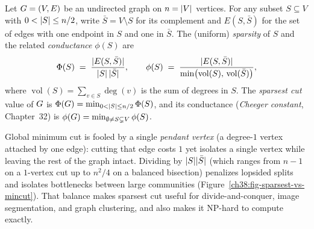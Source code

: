 \begin{definition}\label{ch38:def-sparsest}
Let $G=(V,E)$ be an undirected graph on $n=\lvert V\rvert$ vertices. For any subset $S\subseteq V$ with
$0<\lvert S\rvert\le n/2$, write $\bar S = V\setminus S$ for its complement and $E(S,\bar S)$ for the set of
edges with one endpoint in $S$ and one in $\bar S$. The (uniform) \emph{sparsity} of $S$ and the
related \emph{conductance} $\phi(S)$ are
\[
  \Phi(S) \;=\; \frac{\lvert E(S,\bar S)\rvert}{\lvert S\rvert\,\lvert\bar S\rvert},
  \qquad
  \phi(S) \;=\; \frac{\lvert E(S,\bar S)\rvert}{\min\bigl(\operatorname{vol}(S),\,\operatorname{vol}(\bar S)\bigr)},
\]
where $\operatorname{vol}(S)=\sum_{v\in S}\deg(v)$ is the sum of degrees in $S$. The \emph{sparsest cut}
value of $G$ is $\Phi(G) = \min_{0<\lvert S\rvert\le n/2}\Phi(S)$, and its conductance (\emph{Cheeger constant},
Chapter~32) is $\phi(G) = \min_{\emptyset\neq S\subsetneq V} \phi(S)$.
\end{definition}

\begin{intuitionbox}
Global minimum cut is fooled by a single \emph{pendant vertex} (a degree-$1$ vertex attached by one edge):
cutting that edge costs $1$ yet isolates a single vertex while leaving the rest of the graph intact.
Dividing by $\lvert S\rvert\lvert\bar S\rvert$ (which ranges from $n-1$ on a $1$-vertex cut up to $n^2/4$ on a balanced
bisection) penalizes lopsided splits and isolates bottlenecks between large communities
(Figure~\ref{ch38:fig-sparsest-vs-mincut}). That balance makes sparsest cut useful for divide-and-conquer,
image segmentation, and graph clustering, and also makes it \textsf{NP}-hard to compute exactly.
\end{intuitionbox}


